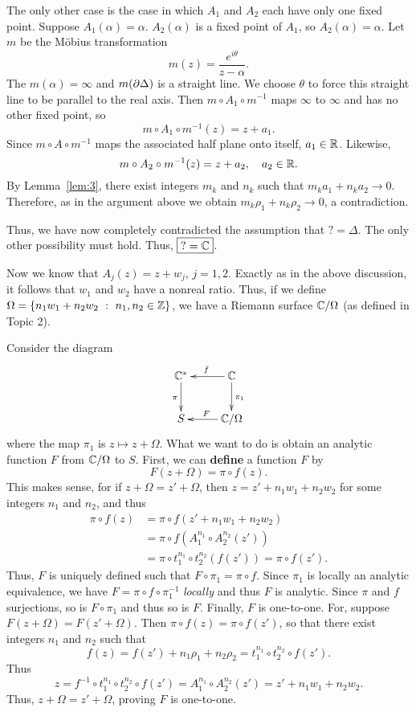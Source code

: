 \documentclass[a4paper,11pt]{article}
\begin{document}
The only other case is the case in which $A_1$ and $A_2$ each have
only one fixed point.  Suppose $A_1(\alpha) = \alpha$. $A_2(\alpha)$
is a fixed point of $A_1$, so $A_2(\alpha) = \alpha$.  Let $m$ be the
M\"obius transformation
$$
m(z) = \frac{e^{i\theta}}{z-\alpha}.
$$
The $m(\alpha) = \infty$ and $m(\partial \Delta)$ is a straight line.  We
choose $\theta$ to force this straight line to be parallel to the real
axis.  Then $m \circ A_1 \circ m^{-1}$ maps $\infty$ to $\infty$ and
has no other fixed point, so
$$
m \circ A_1 \circ m^{-1}(z) = z + a_1.
$$
Since $m \circ A \circ m^{-1}$ maps the associated half plane onto
itself, $a_1 \in {\mathbb R}$.  Likewise,
$$
m \circ A_2 \circ m^{-1}(z) = z + a_2, \quad a_2 \in {\mathbb R}.
$$
By Lemma~\ref{lem:3}, there exist integers $m_k$ and $n_k$ such that
$m_k a_1 + n_k a_2 \to 0$.  Therefore, as in the argument above we
obtain $m_k \rho_1 + n_k \rho_2 \to 0$, a contradiction.

Thus, we have now completely contradicted the assumption that $? =
\Delta$.  The only other possibility must hold.  Thus, $\boxed{? =
  {\mathbb C}}$.

Now we know that $A_j(z) = z + w_j$, $j=1,2$. Exactly as in the above
discussion, it follows that $w_1$ and $w_2$ have a nonreal ratio.
Thus, if we define $\Omega = \{n_1 w_1 + n_2 w_2 ~:~ n_1, n_2 \in
{\mathbb Z}\}$, we have a Riemann surface ${\mathbb C}/\Omega$ (as defined in Topic
2).

Consider the diagram
$$
\xymatrix{
 \CCC^* \ar[d]_\pi & \CCC \ar[l]_f \ar[d]^{\pi_1} \\
 S & \CCC/\Omega \ar[l]_F
}
$$
where the map $\pi_1$ is $z \mapsto z + \Omega$.  What we want to do
is obtain an analytic function $F$ from ${\mathbb C}/\Omega$ to $S$.  First,
we can \textbf{define} a function $F$ by
$$
F(z + \Omega) = \pi \circ f(z).
$$
This makes sense, for if $z + \Omega = z' + \Omega$, then $z = z' +
n_1 w_1 + n_2 w_2$ for some integers $n_1$ and $n_2$, and thus
$$
\begin{aligned}
  \pi \circ f(z) &= \pi \circ f(z' + n_1 w_1 + n_2 w_2)\\
  &= \pi \circ f(A_1^{n_1} \circ A_2^{n_2}(z'))\\
  &= \pi \circ t_1^{n_1} \circ t_2^{n_2} (f(z')) = \pi \circ f(z').
\end{aligned}
$$
Thus, $F$ is uniquely defined such that $F \circ \pi_1 = \pi \circ
f$.  Since $\pi_1$ is locally an analytic equivalence, we have $F =
\pi \circ f \circ \pi_1^{-1}$ \emph{locally} and thus $F$ is
analytic.  Since $\pi$ and $f$ surjections, so is $F \circ \pi_1$ and
thus so is $F$.  Finally, $F$ is one-to-one.  For, suppose $F(z +
\Omega) = F(z' + \Omega)$.  Then $\pi \circ f(z) = \pi \circ f(z')$,
so that there exist integers $n_1$ and $n_2$ such that
$$
f(z) = f(z') + n_1 \rho_1 + n_2 \rho_2 = t_1^{n_1} \circ t_2^{n_2}
\circ f(z').
$$
Thus
$$
z = f^{-1} \circ t_1^{n_1} \circ t_2^{n_2} \circ f(z')
= A_1^{n_1} \circ A_2^{n_2} (z')
= z' + n_1 w_1 + n_2 w_2.
$$
Thus, $z + \Omega = z' + \Omega$, proving $F$ is one-to-one.
\end{document}
